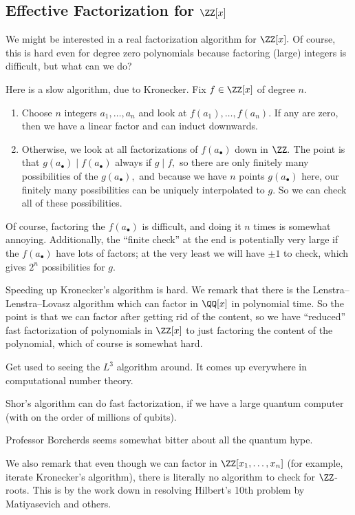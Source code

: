 \subsection{Effective Factorization for \texorpdfstring{$\ZZ[x]$}{}}
We might be interested in a real factorization algorithm for $\ZZ[x].$ Of course, this is hard even for degree zero polynomials because factoring (large) integers is difficult, but what can we do?

Here is a slow algorithm, due to Kronecker. Fix $f\in\ZZ[x]$ of degree $n.$
\begin{enumerate}
	\item Choose $n$ integers $a_1,\ldots,a_n$ and look at $f(a_1),\ldots,f(a_n).$ If any are zero, then we have a linear factor and can induct downwards.
	\item Otherwise, we look at all factorizations of $f(a_\bullet)$ down in $\ZZ.$ The point is that $g(a_\bullet)\mid f(a_\bullet)$ always if $g\mid f,$ so there are only finitely many possibilities of the $g(a_\bullet),$ and because we have $n$ points $g(a_\bullet)$ here, our finitely many possibilities can be uniquely interpolated to $g.$ So we can check all of these possibilities.
\end{enumerate}
Of course, factoring the $f(a_\bullet)$ is difficult, and doing it $n$ times is somewhat annoying. Additionally, the ``finite check'' at the end is potentially very large if the $f(a_\bullet)$ have lots of factors; at the very least we will have $\pm1$ to check, which gives $2^n$ possibilities for $g.$

Speeding up Kronecker's algorithm is hard. We remark that there is the Lenstra--Lenstra--Lovasz algorithm which can factor in $\QQ[x]$ in polynomial time. So the point is that we can factor after getting rid of the content, so we have ``reduced'' fast factorization of polynomials in $\ZZ[x]$ to just factoring the content of the polynomial, which of course is somewhat hard.
\begin{remark}[Nir]
	Get used to seeing the $L^3$ algorithm around. It comes up everywhere in computational number theory.
\end{remark}
\begin{remark}
	Shor's algorithm can do fast factorization, if we have a large quantum computer (with on the order of millions of qu{}bits).
\end{remark}
\begin{remark}
	Professor Borcherds seems somewhat bitter about all the quantum hype.
\end{remark}
We also remark that even though we can factor in $\ZZ[x_1,\ldots,x_n]$ (for example, iterate Kronecker's algorithm), there is literally no algorithm to check for $\ZZ$-roots. This is by the work down in resolving Hilbert's 10th problem by Matiyasevich and others.


